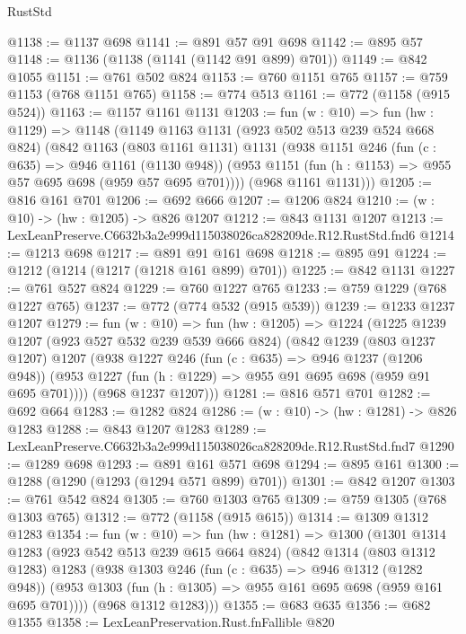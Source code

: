 \begin{lexlean}{RustStd}
\begin{coremodule}
@1138 := @1137 @698
@1141 := @891 @57 @91 @698
@1142 := @895 @57
@1148 := @1136 (@1138 (@1141 (@1142 @91 @899) @701))
@1149 := @842 @1055
@1151 := @761 @502 @824
@1153 := @760 @1151 @765
@1157 := @759 @1153 (@768 @1151 @765)
@1158 := @774 @513
@1161 := @772 (@1158 (@915 @524))
@1163 := @1157 @1161 @1131
@1203 := fun (w : @10) =>
  fun (hw : @1129) =>
  @1148
    (@1149
      @1163
      @1131
      (@923 @502 @513 @239 @524 @668 @824)
      (@842
        @1163
        (@803 @1161 @1131)
        @1131
        (@938
          @1151
          @246
          (fun (c : @635) => @946 @1161 (@1130 @948))
          (@953 @1151 (fun (h : @1153) => @955 @57 @695 @698 (@959 @57 @695 @701))))
        (@968 @1161 @1131)))
@1205 := @816 @161 @701
@1206 := @692 @666
@1207 := @1206 @824
@1210 := (w : @10) -> (hw : @1205) -> @826 @1207
@1212 := @843 @1131 @1207
@1213 := LexLeanPreserve.C6632b3a2e999d115038026ca828209de.R12.RustStd.fnd6
@1214 := @1213 @698
@1217 := @891 @91 @161 @698
@1218 := @895 @91
@1224 := @1212 (@1214 (@1217 (@1218 @161 @899) @701))
@1225 := @842 @1131
@1227 := @761 @527 @824
@1229 := @760 @1227 @765
@1233 := @759 @1229 (@768 @1227 @765)
@1237 := @772 (@774 @532 (@915 @539))
@1239 := @1233 @1237 @1207
@1279 := fun (w : @10) =>
  fun (hw : @1205) =>
  @1224
    (@1225
      @1239
      @1207
      (@923 @527 @532 @239 @539 @666 @824)
      (@842
        @1239
        (@803 @1237 @1207)
        @1207
        (@938
          @1227
          @246
          (fun (c : @635) => @946 @1237 (@1206 @948))
          (@953 @1227 (fun (h : @1229) => @955 @91 @695 @698 (@959 @91 @695 @701))))
        (@968 @1237 @1207)))
@1281 := @816 @571 @701
@1282 := @692 @664
@1283 := @1282 @824
@1286 := (w : @10) -> (hw : @1281) -> @826 @1283
@1288 := @843 @1207 @1283
@1289 := LexLeanPreserve.C6632b3a2e999d115038026ca828209de.R12.RustStd.fnd7
@1290 := @1289 @698
@1293 := @891 @161 @571 @698
@1294 := @895 @161
@1300 := @1288 (@1290 (@1293 (@1294 @571 @899) @701))
@1301 := @842 @1207
@1303 := @761 @542 @824
@1305 := @760 @1303 @765
@1309 := @759 @1305 (@768 @1303 @765)
@1312 := @772 (@1158 (@915 @615))
@1314 := @1309 @1312 @1283
@1354 := fun (w : @10) =>
  fun (hw : @1281) =>
  @1300
    (@1301
      @1314
      @1283
      (@923 @542 @513 @239 @615 @664 @824)
      (@842
        @1314
        (@803 @1312 @1283)
        @1283
        (@938
          @1303
          @246
          (fun (c : @635) => @946 @1312 (@1282 @948))
          (@953 @1303 (fun (h : @1305) => @955 @161 @695 @698 (@959 @161 @695 @701))))
        (@968 @1312 @1283)))
@1355 := @683 @635
@1356 := @682 @1355
@1358 := LexLeanPreservation.Rust.fnFallible @820

\end{coremodule}
\end{lexlean}
